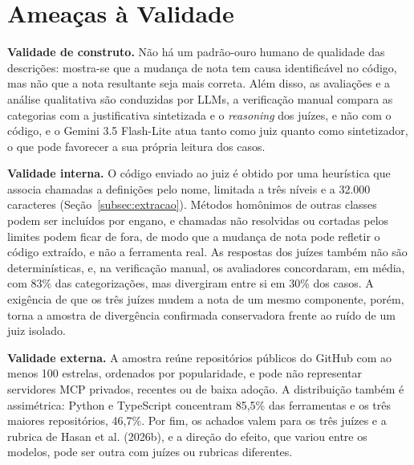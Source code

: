 \section{Ameaças à Validade}
\label{sec:ameacas}

\textbf{Validade de construto.} Não há um padrão-ouro humano de qualidade das descrições: mostra-se que a mudança de nota tem causa identificável no código, mas não que a nota resultante seja mais correta. Além disso, as avaliações e a análise qualitativa são conduzidas por LLMs, a verificação manual compara as categorias com a justificativa sintetizada e o \textit{reasoning} dos juízes, e não com o código, e o Gemini 3.5 Flash-Lite atua tanto como juiz quanto como sintetizador, o que pode favorecer a sua própria leitura dos casos.

\textbf{Validade interna.} O código enviado ao juiz é obtido por uma heurística que associa chamadas a definições pelo nome, limitada a três níveis e a 32.000 caracteres (Seção~\ref{subsec:extracao}). Métodos homônimos de outras classes podem ser incluídos por engano, e chamadas não resolvidas ou cortadas pelos limites podem ficar de fora, de modo que a mudança de nota pode refletir o código extraído, e não a ferramenta real. As respostas dos juízes também não são determinísticas, e, na verificação manual, os avaliadores concordaram, em média, com 83\% das categorizações, mas divergiram entre si em 30\% dos casos. A exigência de que os três juízes mudem a nota de um mesmo componente, porém, torna a amostra de divergência confirmada conservadora frente ao ruído de um juiz isolado.

\textbf{Validade externa.} A amostra reúne repositórios públicos do GitHub com ao menos 100 estrelas, ordenados por popularidade, e pode não representar servidores MCP privados, recentes ou de baixa adoção. A distribuição também é assimétrica: Python e TypeScript concentram 85,5\% das ferramentas e os três maiores repositórios, 46,7\%. Por fim, os achados valem para os três juízes e a rubrica de Hasan et al. (2026b), e a direção do efeito, que variou entre os modelos, pode ser outra com juízes ou rubricas diferentes.
